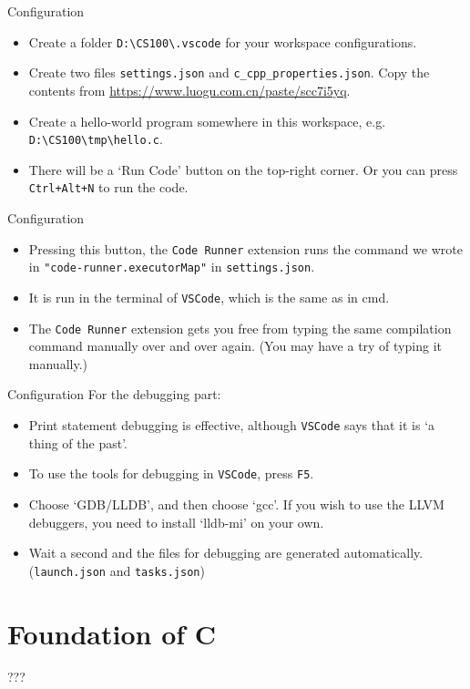 \documentclass{beamer}
\begin{document}
\begin{frame}{Configuration}
    \begin{itemize}
        \item Create a folder \texttt{D:\textbackslash CS100\textbackslash .vscode} for your workspace configurations.
        \item Create two files \texttt{settings.json} and \texttt{c\_cpp\_properties.json}. Copy the contents from \url{https://www.luogu.com.cn/paste/scc7i5yq}.
        \pause
        \item Create a hello-world program somewhere in this workspace, e.g. \texttt{D:\textbackslash CS100\textbackslash tmp\textbackslash hello.c}.
        \item There will be a `Run Code' button on the top-right corner. Or you can press \texttt{Ctrl+Alt+N} to run the code.
    \end{itemize}
\end{frame}

\begin{frame}{Configuration}
    \begin{itemize}
        \item Pressing this button, the \texttt{Code Runner} extension runs the command we wrote in \texttt{"code-runner.executorMap"} in \texttt{settings.json}.
        \item It is run in the terminal of \texttt{VSCode}, which is the same as in cmd.
        \item The \texttt{Code Runner} extension gets you free from typing the same compilation command manually over and over again. (You may have a try of typing it manually.)
    \end{itemize}
\end{frame}

\begin{frame}{Configuration}
    For the debugging part:
    \begin{itemize}
        \item Print statement debugging is effective, although \texttt{VSCode} says that it is `a thing of the past'.
        \item To use the tools for debugging in \texttt{VSCode}, press \texttt{F5}.
        \item Choose `GDB/LLDB', and then choose `gcc'. If you wish to use the LLVM debuggers, you need to install `lldb-mi' on your own.
        \item Wait a second and the files for debugging are generated automatically. (\texttt{launch.json} and \texttt{tasks.json})
    \end{itemize}
\end{frame}

\section{Foundation of C}

\begin{frame}
    ???
\end{frame}
\end{document}
